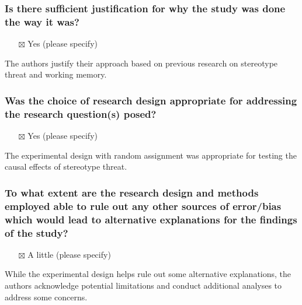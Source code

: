 \documentclass[
  doc, a4paper]{apa7}
\providecommand{\tightlist}{%
  \setlength{\itemsep}{0pt}\setlength{\parskip}{0pt}}
\begin{document}
\subsubsection{Is there sufficient justification for why the study was done the way it was?}\label{is-there-sufficient-justification-for-why-the-study-was-done-the-way-it-was}

\begin{itemize}
\tightlist
\item[$\boxtimes$]
  Yes (please specify)
\end{itemize}

The authors justify their approach based on previous research on stereotype threat and working memory.

\subsubsection{Was the choice of research design appropriate for addressing the research question(s) posed?}\label{was-the-choice-of-research-design-appropriate-for-addressing-the-research-questions-posed}

\begin{itemize}
\tightlist
\item[$\boxtimes$]
  Yes (please specify)
\end{itemize}

The experimental design with random assignment was appropriate for testing the causal effects of stereotype threat.

\subsubsection{To what extent are the research design and methods employed able to rule out any other sources of error/bias which would lead to alternative explanations for the findings of the study?}\label{to-what-extent-are-the-research-design-and-methods-employed-able-to-rule-out-any-other-sources-of-errorbias-which-would-lead-to-alternative-explanations-for-the-findings-of-the-study}

\begin{itemize}
\tightlist
\item[$\boxtimes$]
  A little (please specify)
\end{itemize}

While the experimental design helps rule out some alternative explanations, the authors acknowledge potential limitations and conduct additional analyses to address some concerns.
\end{document}
